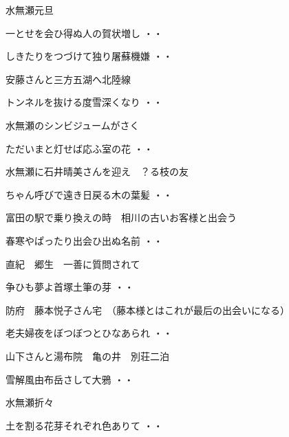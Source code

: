 \vspace{ 0.4cm}
水無瀬元旦
\begin{shiika}一とせを会ひ得ぬ人の賀状増し
\hfill{・・}\end{shiika}
\begin{shiika}しきたりをつづけて独り屠蘇機嫌
\hfill{・・}\end{shiika}
\vspace{ 0.4cm}
安藤さんと三方五湖へ北陸線
\begin{shiika}トンネルを抜ける度雪深くなり
\hfill{・・}\end{shiika}
\vspace{ 0.4cm}
水無瀬のシンビジュームがさく
\begin{shiika}ただいまと灯せば応ふ室の花
\hfill{・・}\end{shiika}
\vspace{ 0.4cm}
水無瀬に石井晴美さんを迎え　？る枝の友
\begin{shiika}ちゃん呼びで遠き日戻る木の葉髪
\hfill{・・}\end{shiika}
\vspace{ 0.4cm}
富田の駅で乗り換えの時　相川の古いお客様と出会う
\begin{shiika}春寒やぱったり出会ひ出ぬ名前
\hfill{・・}\end{shiika}
\vspace{ 0.4cm}
直紀　郷生　一善に質問されて
\begin{shiika}争ひも夢よ首塚土筆の芽
\hfill{・・}\end{shiika}
\vspace{ 0.4cm}
防府　藤本悦子さん宅　（藤本様とはこれが最后の出会いになる）
\begin{shiika}老夫婦夜をぼつぼつとひなあられ
\hfill{・・}\end{shiika}
\vspace{ 0.4cm}
山下さんと湯布院　亀の井　別荘二泊
\begin{shiika}雪解風由布岳さして大鴉
\hfill{・・}\end{shiika}
\vspace{ 0.4cm}
水無瀬折々
\begin{shiika}土を割る花芽それぞれ色ありて
\hfill{・・}\end{shiika}
